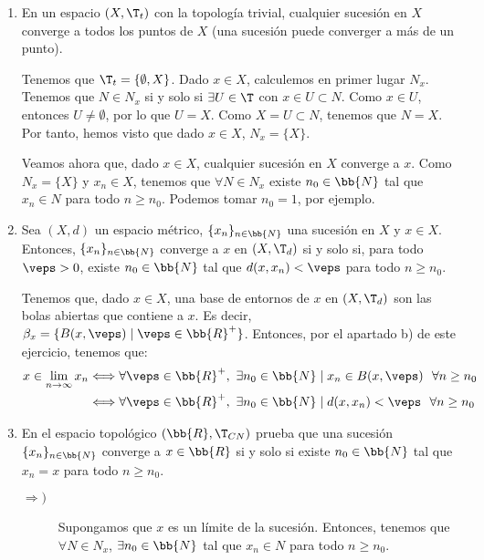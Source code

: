 \begin{ejercicio}
\begin{enumerate}[label=\alph*)]
        \item En un espacio $(X,\T_t)$ con la topología trivial, cualquier sucesión en $X$ converge a todos los puntos de $X$ (una sucesión puede converger a más de un punto).

        Tenemos que $\T_t=\{\emptyset, X\}$. Dado $x\in X$, calculemos en primer lugar $N_x$. Tenemos que $N\in N_x$ si y solo si $\exists U\in \T$ con $x\in U\subset N$. Como $x\in U$, entonces $U\neq \emptyset$, por lo que $U=X$. Como $X=U\subset N$, tenemos que $N=X$. Por tanto, hemos visto que dado $x\in X$, $N_x=\{X\}$.

        Veamos ahora que, dado $x\in X$, cualquier sucesión en $X$ converge a $x$. Como $N_x=\{X\}$ y $x_n\in X$, tenemos que $\forall N\in N_x$ existe $n_0\in \bb{N}$ tal que $x_n\in N$ para todo $n\geq n_0$. Podemos tomar $n_0=1$, por ejemplo.

        \item Sea $(X,d)$ un espacio métrico, $\{x_n\}_{n\in \bb{N}}$ una sucesión en $X$ y $x\in X$. Entonces, $\{x_n\}_{n\in \bb{N}}$ converge a $x$ en $(X,\T_d)$ si y solo si, para todo $\veps>0$, existe $n_0\in \bb{N}$ tal que $d(x,x_n)<\veps$ para todo $n\geq n_0$.

        Tenemos que, dado $x\in X$, una base de entornos de $x$ en $(X,\T_d)$ son las bolas abiertas que contiene a $x$. Es decir, $\beta_x=\{B(x,\veps)\mid \veps\in \bb{R}^+\}$. Entonces, por el apartado b) de este ejercicio, tenemos que:
        \begin{equation*}\begin{split}
            x\in \lim_{n\to \infty}x_n &\Longleftrightarrow
            \forall \veps\in \bb{R}^+,~ \exists n_0\in \bb{N}\mid x_n\in B(x,\veps)~~  \forall n\geq n_0\\
            &\Longleftrightarrow
            \forall \veps\in \bb{R}^+,~ \exists n_0\in \bb{N}\mid d(x,x_n)<\veps~~  \forall n\geq n_0
        \end{split}\end{equation*}

        \item En el espacio topológico $(\bb{R}, \T_{CN})$ prueba que una sucesión $\{x_n\}_{n\in \bb{N}}$ converge a $x\in \bb{R}$ si y solo si existe $n_0\in \bb{N}$ tal que $x_n=x$ para todo $n\geq n_0$.

        \begin{description}
            \item[$\Longrightarrow)$] Supongamos que $x$ es un límite de la sucesión. Entonces, tenemos que $\forall N\in N_x$, $\exists n_0\in \bb{N}$ tal que $x_n\in N$ para todo $n\geq n_0$.


\end{description}
\end{enumerate}
\end{ejercicio}
